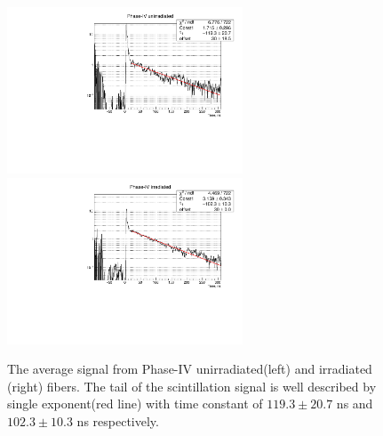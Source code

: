 \documentclass[a4paper,11pt]{article}
\begin{document}
\begin{figure}[ht]
\begin{center}
      \includegraphics[width=7cm]{Figures/B5_R11864_fit_zoom_singleLog.pdf}
      \includegraphics[width=7cm]{Figures/B4_R11863_fit_zoom_singleLog.pdf}
\caption{\small The average signal from Phase-IV unirradiated(left) and irradiated (right) fibers. The tail of the scintillation signal is well described by single exponent(red line) with time constant of $119.3 \pm 20.7$ ns and $102.3 \pm 10.3$ ns respectively.}
    \label{fig:phase4scintTime}
\end{center}
\end{figure}



\end{document}

